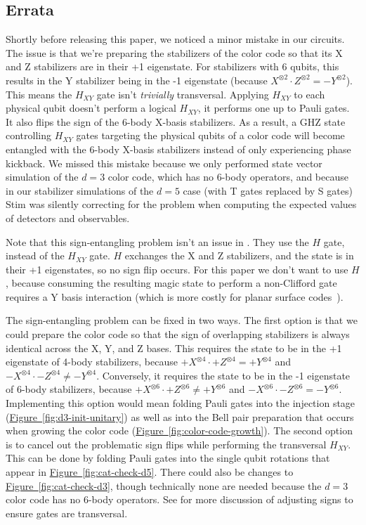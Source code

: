\documentclass[onecolumn,unpublished,a4paper]{quantumarticle}
\theoremstyle{definition}
\newcommand{\fig}[1]{\hyperref[fig:#1]{Figure~\ref*{fig:#1}}}
\begin{document}
\subsection{Errata}
\label{sec:Errata}

Shortly before releasing this paper, we noticed a minor mistake in our circuits. 
The issue is that we're preparing the stabilizers of the color code so that its X and Z stabilizers are in their +1 eigenstate.
For stabilizers with 6 qubits, this results in the Y stabilizer being in the -1 eigenstate (because $X^{\otimes 2} \cdot Z^{\otimes 2} = -Y^{\otimes 2}$).
This means the $H_{XY}$ gate isn't \emph{trivially} transversal.
Applying $H_{XY}$ to each physical qubit doesn't perform a logical $H_{XY}$, it performs one up to Pauli gates.
It also flips the sign of the 6-body X-basis stabilizers.
As a result, a GHZ state controlling $H_{XY}$ gates targeting the physical qubits of a color code will become entangled with the 6-body X-basis stabilizers instead of only experiencing phase kickback.
We missed this mistake because we only performed state vector simulation of the $d=3$ color code, which has no 6-body operators, and because in our stabilizer simulations of the $d=5$ case (with T gates replaced by S gates) Stim was silently correcting for the problem when computing the expected values of detectors and observables.

Note that this sign-entangling problem isn't an issue in \cite{chamberland2020colorinjection}.
They use the $H$ gate, instead of the $H_{XY}$ gate.
$H$ exchanges the X and Z stabilizers, and the state is in their +1 eigenstates, so no sign flip occurs.
For this paper we don't want to use $H$, because consuming the resulting magic state to perform a non-Clifford gate requires a Y basis interaction (which is more costly for planar surface codes~\cite{gidney2024ybasis}).

The sign-entangling problem can be fixed in two ways.
The first option is that we could prepare the color code so that the sign of overlapping stabilizers is always identical across the X, Y, and Z bases.
This requires the state to be in the +1 eigenstate of 4-body stabilizers, because $+X^{\otimes 4} \cdot +Z^{\otimes 4} = +Y^{\otimes 4}$ and $-X^{\otimes 4} \cdot -Z^{\otimes 4} \neq -Y^{\otimes 4}$.
Conversely, it requires the state to be in the -1 eigenstate of 6-body stabilizers, because $+X^{\otimes 6} \cdot +Z^{\otimes 6} \neq +Y^{\otimes 6}$ and $-X^{\otimes 6} \cdot -Z^{\otimes 6} = -Y^{\otimes 6}$.
Implementing this option would mean folding Pauli gates into the injection stage (\fig{d3-init-unitary}) as well as into the Bell pair preparation that occurs when growing the color code (\fig{color-code-growth}).
The second option is to cancel out the problematic sign flips while performing the transversal $H_{XY}$.
This can be done by folding Pauli gates into the single qubit rotations that appear in \fig{cat-check-d5}.
There could also be changes to \fig{cat-check-d3}, though technically none are needed because the $d=3$ color code has no 6-body operators.
See \cite{bombin2013gauge} for more discussion of adjusting signs to ensure gates are transversal.
\end{document}
